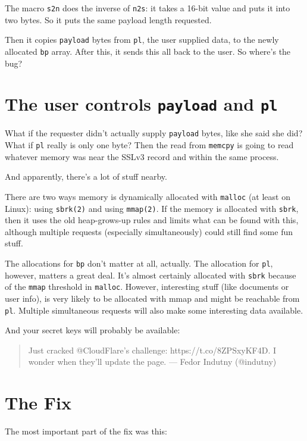 \documentclass[10pt,twoside,openleft]{memoir}
\begin{document}
The macro \texttt{s2n} does the inverse of \texttt{n2s}: it takes a 16-bit value and puts it into two bytes. So it puts the same payload length requested.

Then it copies \texttt{payload} bytes from \texttt{pl}, the user supplied data, to the newly allocated \texttt{bp} array. After this, it sends this all back to the user. So where's the bug?

\section{The user controls \texttt{payload} and \texttt{pl}}

What if the requester didn't actually supply \texttt{payload} bytes, like she said she did? What if \texttt{pl} really is only one byte? Then the read from \texttt{memcpy} is going to read whatever memory was near the SSLv3 record and within the same process.

And apparently, there's a lot of stuff nearby.

There are two ways memory is dynamically allocated with \texttt{malloc} (at least on Linux): using \texttt{sbrk(2)} and using \texttt{mmap(2)}. If the memory is allocated with \texttt{sbrk}, then it uses the old heap-grows-up rules and limits what can be found with this, although multiple requests (especially simultaneously) could still find some fun stuff.

The allocations for \texttt{bp} don't matter at all, actually. The allocation for \texttt{pl}, however, matters a great deal. It's almost certainly allocated with \texttt{sbrk} because of the \texttt{mmap} threshold in \texttt{malloc}. However, interesting stuff (like documents or user info), is very likely to be allocated with mmap and might be reachable from \texttt{pl}. Multiple simultaneous requests will also make some interesting data available.

And your secret keys will probably be available:

\begin{quote}
 \raggedright Just cracked @CloudFlare's challenge: https://t.co/8ZPSxyKF4D. I wonder when they'll update the page. --- Fedor Indutny (@indutny)
\end{quote}

\section{The Fix}

The most important part of the fix was this:
\end{document}
